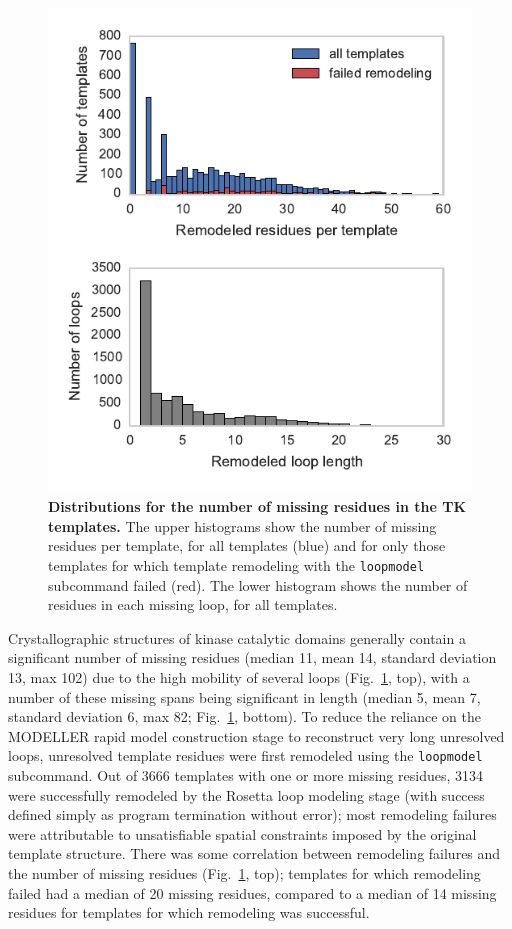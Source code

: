 \documentclass[aps,pre,twocolumn,nofootinbib,superscriptaddress,linenumbers]{revtex4-1}
\begin{document}
\begin{figure}[tbp]
    \includegraphics[width=\textwidth]{loopmodel_analysis/nmissing_resis_distributions.pdf}
    \caption{{\bf Distributions for the number of missing residues in the TK templates.}
    The upper histograms show the number of missing residues per template, for all templates (blue) and for only those templates for which template remodeling with the {\tt loopmodel} subcommand failed (red).
    The lower histogram shows the number of residues in each missing loop, for all templates.
}
    \label{figure:loopmodel-nmissing-residues}
\end{figure}

Crystallographic structures of kinase catalytic domains generally contain a significant number of missing residues (median 11, mean 14, standard deviation 13, max 102) due to the high mobility of several loops (Fig.~\ref{figure:loopmodel-nmissing-residues}, top), with a number of these missing spans being significant in length (median 5, mean 7, standard deviation 6, max 82; Fig.~\ref{figure:loopmodel-nmissing-residues}, bottom).
To reduce the reliance on the MODELLER rapid model construction stage to reconstruct very long unresolved loops, unresolved template residues were first remodeled using the {\tt loopmodel} subcommand.
Out of \num{3666} templates with one or more missing residues, \num{3134} were successfully remodeled by the Rosetta loop modeling stage (with success defined simply as program termination without error); most remodeling failures were attributable to unsatisfiable spatial constraints imposed by the original template structure.
There was some correlation between remodeling failures and the number of missing residues (Fig.~\ref{figure:loopmodel-nmissing-residues}, top); templates for which remodeling failed had a median of 20 missing residues, compared to a median of 14 missing residues for templates for which remodeling was successful.
\end{document}
